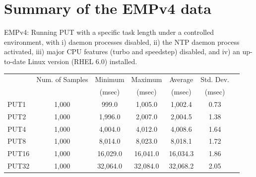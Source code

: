 \documentclass[10pt]{article}
\begin{document}
\clearpage
\newpage

\section{Summary of the EMPv4 data~\label{sec:emp4_summary}}
EMPv4: Running PUT with a specific task length under a controlled environment, 
with i) daemon processes disabled, 
ii) the NTP daemon process activated,
iii) major CPU features (turbo and speedstep) disabled, and
iv) an up-to-date Linux version (RHEL 6.0) installed.

\begin{table}[h]
\centering
{
 \begin{tabular}{|l|c|c|c|c|c|c|} \hline
\multirow{2}{*}{}   & Num. of Samples & Minimum & Maximum & Average & Std. Dev. \\ 
                        & & (msec)  & (msec)  & (msec)  & (msec) \\ \hline
 PUT1  & 1,000 & 999.0 & 1,005.0 & 1,002.4 & 0.73\\ \hline


 PUT2 & 1,000 & 1,996.0 & 2,007.0 & 2,004.5 & 1.38 \\\hline


 PUT4 & 1,000 & 4,004.0 & 4,012.0 & 4,008.6 & 1.64\\\hline


 PUT8 & 1,000 & 8,014.0 & 8,023.0 & 8,018.1 & 1.72 \\\hline 


 PUT16 & 1,000 & 16,029.0 & 16,041.0 & 16,034.3 & 1.86 \\ \hline


 PUT32 & 1,000 & 32,064.0 & 32,084.0 & 32,068.2 & 2.05 \\ \hline 



\end{tabular}}
\end{table}
\end{document}
